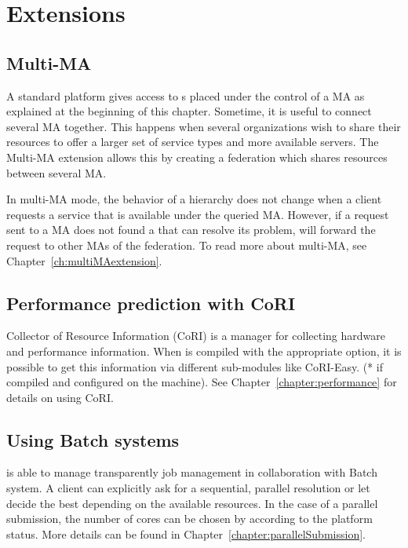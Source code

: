 \section{\diet Extensions}
\label{sec:extensions}

\subsection{Multi-MA}
\label{init:multima}

A standard \diet platform gives access to {\sed}s placed under the control of a
MA as explained at the beginning of this chapter. Sometime, it is useful to
connect several MA together. This happens when several organizations wish to
share their resources to offer a larger set of service types and more available
servers. The Multi-MA extension allows this by creating a federation which
shares resources between several MA.

In multi-MA mode, the behavior of a \diet hierarchy does not change when a
client requests a service that is available under the queried MA. However, if a
request sent to a MA does not found a \sed that can resolve its problem, \diet
will forward the request to other MAs of the federation. To read more about
multi-MA, see Chapter~\ref{ch:multiMAextension}. 

\subsection{Performance prediction with CoRI}
\label{sub:cori}

Collector of Resource Information (CoRI) is a manager for collecting hardware
and performance information.  When \diet is compiled with the appropriate
option, it is possible to get this information via different sub-modules like
 CoRI-Easy. (* if compiled and configured on the \sed machine). See
Chapter~\ref{chapter:performance} for details on using CoRI.

\subsection{Using Batch systems}
\label{sub:batch}

\diet is able to manage transparently job management in collaboration
with Batch system. A client can explicitly ask for a sequential,
parallel resolution or let \diet decide the best depending on the
available resources. In the case of a parallel submission, the number
of cores can be chosen by \diet according to the platform status. More
details can be found in Chapter~\ref{chapter:parallelSubmission}.

